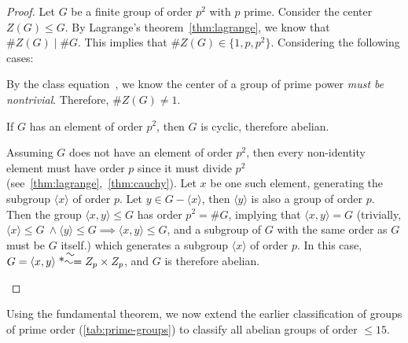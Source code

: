 \begin{proof}
  Let $G$ be a finite group of order $p^2$ with $p$ prime.
  Consider the center $Z(G) \le G$.
  By Lagrange's theorem~\ref{thm:lagrange}, we know that $\#Z(G) \mid \#G$.
  This implies that $\#Z(G) \in \{1,p,p^2\}$. Considering the following cases:
  \begin{enumalph}
    \item By the class equation~\cite[p.~125,~Theorem~8]{DummitFoote},
      we know the center of a group of prime power \emph{must be nontrivial}.
      Therefore, $\#Z(G) \ne 1$.
    \item If $G$ has an element of order $p^2$, then $G$ is cyclic, therefore
      abelian.
    \item Assuming $G$ does not have an element of order $p^2$,
      then every non-identity element must have order $p$ since it must divide $p^2$
      (see~\ref{thm:lagrange},~\ref{thm:cauchy}).
      Let $x$ be one such element, generating the subgroup $\langle x \rangle$ of order $p$.
      Let $y \in G - \langle x \rangle$, then $\langle y \rangle$ is also a group of order $p$.
      Then the group $\langle x, y \rangle \le G$ has order $p^2 = \#G$,
      implying that $\langle x, y \rangle = G$ (trivially,
      $\langle x \rangle \le G\ \land \langle y \rangle \le G \implies
      \langle x, y \rangle \le G$, and a subgroup of $G$ with the same order as $G$
      must be $G$ itself.) which generates a subgroup $\langle x \rangle$ of order $p$.
      In this case, $G = \langle x, y \rangle \isom Z_p \times Z_p$, and $G$
      is therefore abelian.
  \end{enumalph}
\end{proof}

Using the fundamental theorem, we now extend the earlier classification
of groups of prime order (\ref{tab:prime-groups})
to classify all abelian groups of order $\le 15$.


